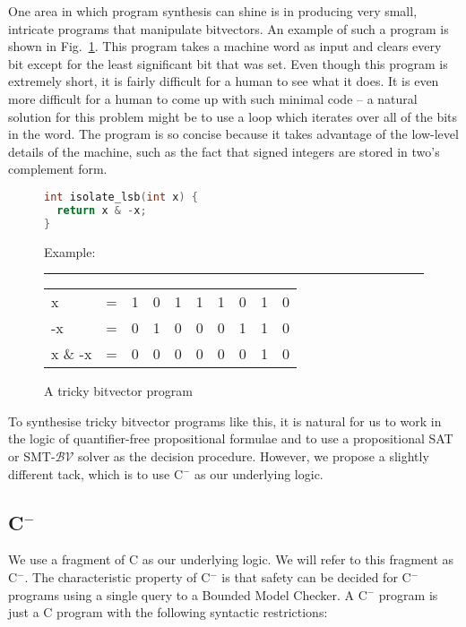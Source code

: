 \documentclass[a4paper]{llncs}
\newcommand{\newC}{C$^-$\xspace}
\begin{document}
One area in which program synthesis can shine is in producing very small,
intricate programs that manipulate bitvectors.  An example of such a program
is shown in Fig.~\ref{fig:bitvector-program}.  This program takes a machine word
as input and clears every bit except for the least significant bit that was set.
Even though this program is extremely short, it is fairly difficult for a human
to see what it does.  It is even more difficult for a human to come up with such
minimal code -- a natural solution for this problem might be to use a loop which
iterates over all of the bits in the word.  The program is so concise because it
takes advantage of the low-level details of the machine, such as the fact that
signed integers are stored in two's complement form.

\begin{figure}
\centering
\begin{minipage}{0.45\linewidth}
 \begin{lstlisting}[language=C]
int isolate_lsb(int x) {
  return x & -x;
}
 \end{lstlisting}
\end{minipage}
\begin{minipage}{0.45\linewidth}
 
Example:

\hrule

\begin{tabular}{llcccccccc}
 x       & = & 1 & 0 & 1 & 1 & 1 & 0 & 1 & 0 \\
 -x      & = & 0 & 1 & 0 & 0 & 0 & 1 & 1 & 0 \\
 x \& -x & = & 0 & 0 & 0 & 0 & 0 & 0 & 1 & 0
\end{tabular}
\end{minipage}


 \caption{A tricky bitvector program}
  \label{fig:bitvector-program}
\end{figure}


To synthesise tricky bitvector programs like this, it is natural for us to
work in the logic of quantifier-free propositional formulae and to use a
propositional SAT or SMT-$\mathcal{BV}$ solver as the decision procedure. 
However, we propose a slightly different tack, which is to use \newC as
our underlying logic.


\subsection{\newC}
\label{sec:logic}

We use a fragment of C as our underlying logic.  We will refer to this fragment
as \newC.  The characteristic property of \newC is that safety can be decided for
\newC programs using a single query to a Bounded Model Checker.  A \newC program is
just a C program with the following syntactic restrictions:
\end{document}
